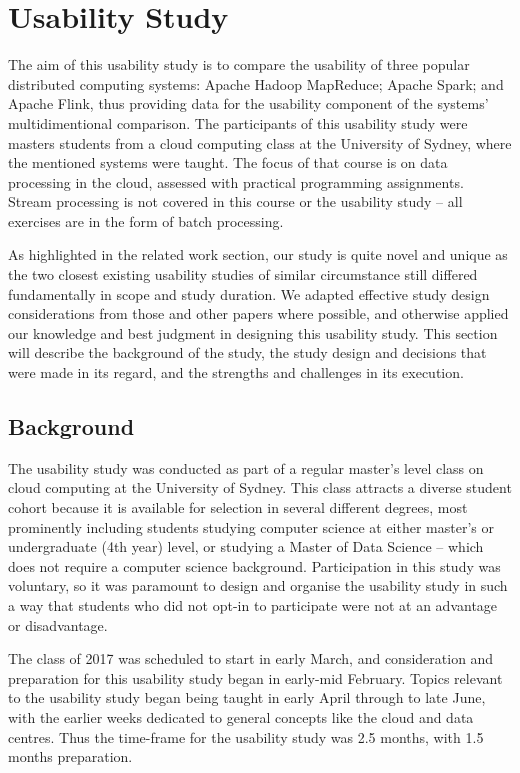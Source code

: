 \chapter{Usability Study}
\label{USABILITY_STUDY}

  The aim of this usability study is to compare the usability of three popular distributed computing systems: Apache Hadoop MapReduce; Apache Spark; and Apache Flink, thus providing data for the usability component of the systems' multidimentional comparison. The participants of this usability study were masters students from a cloud computing class at the University of Sydney, where the mentioned systems were taught. The focus of that course is on data processing in the cloud, assessed with practical programming assignments. Stream processing is not covered in this course or the usability study -- all exercises are in the form of batch processing.
  
  As highlighted in the related work section, our study is quite novel and unique as the two closest existing usability studies of similar circumstance still differed fundamentally in scope and study duration. We adapted effective study design considerations from those and other papers where possible, and otherwise applied our knowledge and best judgment in designing this usability study. This section will describe the background of the study, the study design and decisions that were made in its regard, and the strengths and challenges in its execution.


\section{Background}

  The usability study was conducted as part of a regular master's level class on cloud computing at the University of Sydney. This class attracts a diverse student cohort because it is available for selection in several different degrees, most prominently including students studying computer science at either master's or undergraduate (4th year) level, or studying a Master of Data Science -- which does not require a computer science background. Participation in this study was voluntary, so it was paramount to design and organise the usability study in such a way that students who did not opt-in to participate were not at an advantage or disadvantage. 

  The class of 2017 was scheduled to start in early March, and consideration and preparation for this usability study began in early-mid February. Topics relevant to the usability study began being taught in early April through to late June, with the earlier weeks dedicated to general concepts like the cloud and data centres. Thus the time-frame for the usability study was 2.5 months, with 1.5 months preparation.

